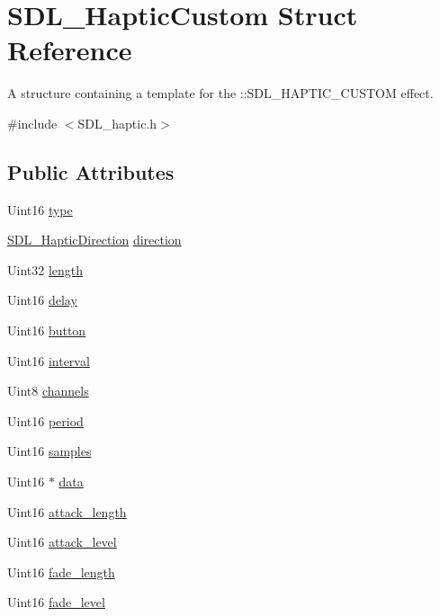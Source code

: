 \hypertarget{structSDL__HapticCustom}{\section{S\+D\+L\+\_\+\+Haptic\+Custom Struct Reference}
\label{structSDL__HapticCustom}
}


A structure containing a template for the \+::\+S\+D\+L\+\_\+\+H\+A\+P\+T\+I\+C\+\_\+\+C\+U\+S\+T\+O\+M effect.  




{\ttfamily \#include $<$S\+D\+L\+\_\+haptic.\+h$>$}

\subsection*{Public Attributes}
\begin{DoxyCompactItemize}
\item 
Uint16 \hyperlink{structSDL__HapticCustom_a98a8995c94492069dc007502ed97eed2}{type}
\item 
\hyperlink{structSDL__HapticDirection}{S\+D\+L\+\_\+\+Haptic\+Direction} \hyperlink{structSDL__HapticCustom_ad7eb84f59404d9e0da07570b4b57dd43}{direction}
\item 
Uint32 \hyperlink{structSDL__HapticCustom_ad70e8bc2cff74b99d704a757c16b363f}{length}
\item 
Uint16 \hyperlink{structSDL__HapticCustom_a094229466ff4cf695860db664100a2b0}{delay}
\item 
Uint16 \hyperlink{structSDL__HapticCustom_aa4fbaf7220f3197aa6631b3e64ad6562}{button}
\item 
Uint16 \hyperlink{structSDL__HapticCustom_afdeb26b1709254545e00a59a0a6c360c}{interval}
\item 
Uint8 \hyperlink{structSDL__HapticCustom_a560215762e9096d583d75867d9227cf5}{channels}
\item 
Uint16 \hyperlink{structSDL__HapticCustom_aba7fafa808e90baddef25f009b8f4817}{period}
\item 
Uint16 \hyperlink{structSDL__HapticCustom_a5905ea1b6182da846535ca8c80b4fa33}{samples}
\item 
Uint16 $\ast$ \hyperlink{structSDL__HapticCustom_a3c3366f759e8f071468305141c8684ce}{data}
\item 
Uint16 \hyperlink{structSDL__HapticCustom_a018b35d89398c26e10d1fb4315d1dda1}{attack\+\_\+length}
\item 
Uint16 \hyperlink{structSDL__HapticCustom_ad6e394e3775372af3eb9e02823987405}{attack\+\_\+level}
\item 
Uint16 \hyperlink{structSDL__HapticCustom_ab47fac94baeba28a3acd6c706e0b6a5c}{fade\+\_\+length}
\item 
Uint16 \hyperlink{structSDL__HapticCustom_a73a522581eb514d032e500ec6294fe50}{fade\+\_\+level}
\end{DoxyCompactItemize}


